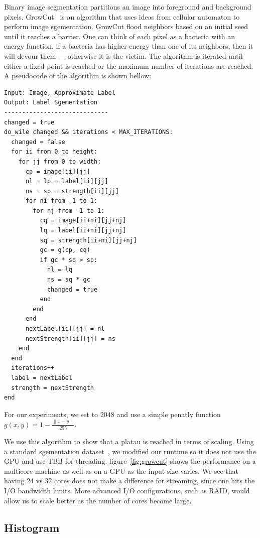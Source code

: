 Binary image segmentation partitions an image into foreground and background
  pixels.
GrowCut~\cite{vezhnevets2005growcut} is an algorithm that uses ideas from cellular automaton to perform image
  sgementation.
GrowCut flood
  neighbors based on an initial seed until it reaches a barrier.
One can think of each pixel as a bacteria with an energy function, if a bacteria has
  higher energy than one of its neighbors, then it will devour them --- otherwise it
  is the victim.
The algorithm is iterated until either a fixed point is reached or the maximum number
  of iterations are reached.
A pseudocode of the algorithm is shown bellow:


\begin{lstlisting}
Input: Image, Approximate Label
Output: Label Sgementation
-----------------------------
changed = true
do_wile changed && iterations < MAX_ITERATIONS:
  changed = false
  for ii from 0 to height:
    for jj from 0 to width:
      cp = image[ii][jj]
      nl = lp = label[ii][jj]
      ns = sp = strength[ii][jj]
      for ni from -1 to 1:
        for nj from -1 to 1:
          cq = image[ii+ni][jj+nj]
          lq = label[ii+ni][jj+nj]
          sq = strength[ii+ni][jj+nj]
          gc = g(cp, cq)
          if gc * sq > sp:
            nl = lq
            ns = sq * gc
            changed = true
          end
        end
      end
      nextLabel[ii][jj] = nl
      nextStrength[ii][jj] = ns
    end
  end
  iterations++
  label = nextLabel
  strength = nextStrength
end
\end{lstlisting}

For our experiments, we set  to $2048$ and use a
  simple penatly function $g(x,y)  = 1 - \frac{\|x - y\|}{255}$.

We use this algorithm to show that a platau is reached in terms of scaling.
Using a standard sgementation dataset~\cite{gridcut}, we modified our runtime so
  it does not use the GPU and use TBB for threading. figure~\ref{fig:growcut} shows the
  performance on a multicore machine as well as on a GPU as the input
  size varies.
We see that having $24$ vs $32$ cores does not make a difference for streaming, since
  one hits the I/O bandwidth limits.
More advanced I/O configurations, such as RAID, would allow us to scale better as the number of cores become large. 

\subsection{Histogram}

